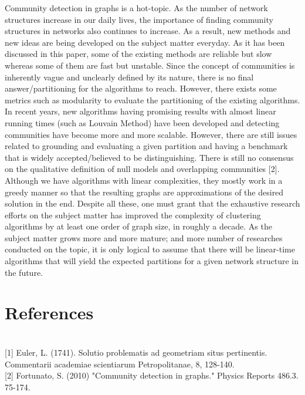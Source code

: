 \documentclass[10pt]{article}
\begin{document}
Community detection in graphs is a hot-topic. As the number of network structures increase in our daily lives, the importance of finding community structures in networks also continues to increase. As a result, new methods and new ideas are being developed on the subject matter everyday. As it has been discussed in this paper, some of the existing methods are reliable but slow whereas some of them are fast but unstable. Since the concept of communities is inherently vague and unclearly defined by its nature, there is no final answer/partitioning for the algorithms to reach. However, there exists some metrics such as modularity to evaluate the partitioning of the existing algorithms. \\

In recent years, new algorithms having promising results with almost linear running times (such as Louvain Method) have been developed and detecting communities have become more and more scalable. However, there are still issues related to grounding and evaluating a given partition and having a benchmark that is widely accepted/believed to be distinguishing. There is still no consensus on the qualitative definition of null models and overlapping communities [2]. Although we have algorithms with linear complexities, they mostly work in a greedy manner so that the resulting graphs are approximations of the desired solution in the end. Despite all these, one must grant that the exhaustive research efforts on the subject matter has improved the complexity of clustering algorithms by at least one order of graph size, in roughly a decade. As the subject matter grows more and more mature; and more number of researches conducted on the topic, it is only logical to assume that there will be linear-time algorithms that will yield the expected partitions for a given network structure in the future. \\

\section{References} \\

[1] Euler, L. (1741). Solutio problematis ad geometriam situs pertinentis. Commentarii academiae scientiarum Petropolitanae, 8, 128-140. \\

[2] Fortunato, S. (2010) "Community detection in graphs." Physics Reports 486.3. 75-174. \\
\end{document}

